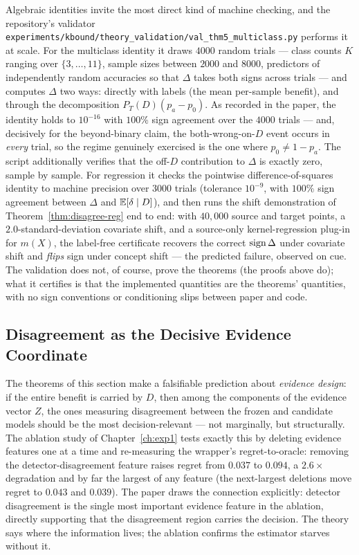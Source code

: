 Algebraic identities invite the most direct kind of machine checking, and the
repository's validator
\texttt{experiments/kbound/theory\_validation/val\_thm5\_multiclass.py}
\cite{kbound2026repo} performs it at scale. For the multiclass identity it draws
$4000$ random trials --- class counts $K$ ranging over $\{3,\dots,11\}$, sample sizes
between $2000$ and $8000$, predictors of independently random accuracies so that
$\Delta$ takes both signs across trials --- and computes $\Delta$ two ways: directly
with labels (the mean per-sample benefit), and through the decomposition
$P_T(D)(p_a-p_0)$. As recorded in the paper, the identity holds to $10^{-16}$ with
$100\%$ sign agreement over the $4000$ trials --- and, decisively for the
beyond-binary claim, the both-wrong-on-$D$ event occurs in \emph{every} trial, so the
regime genuinely exercised is the one where $p_0\neq1-p_a$. The script additionally
verifies that the off-$D$ contribution to $\Delta$ is exactly zero, sample by sample.
For regression it checks the pointwise difference-of-squares identity to machine
precision over $3000$ trials (tolerance $10^{-9}$, with $100\%$ sign agreement between
$\Delta$ and $\mathbb{E}[\delta\mid D]$), and then runs the shift demonstration of
Theorem~\ref{thm:disagree-reg} end to end: with $40{,}000$ source and target points, a
$2.0$-standard-deviation covariate shift, and a source-only kernel-regression plug-in
for $m(X)$, the label-free certificate recovers the correct $\operatorname{sign}\Delta$ under
covariate shift and \emph{flips} sign under concept shift --- the predicted failure,
observed on cue. The validation does not, of course, prove the theorems (the proofs
above do); what it certifies is that the implemented quantities are the theorems'
quantities, with no sign conventions or conditioning slips between paper and code.

\subsection{Disagreement as the Decisive Evidence Coordinate}
\label{sec:t2-disagree-evidence}

The theorems of this section make a falsifiable prediction about \emph{evidence
design}: if the entire benefit is carried by $D$, then among the components of the
evidence vector $Z$, the ones measuring disagreement between the frozen and candidate
models should be the most decision-relevant --- not marginally, but structurally. The
ablation study of Chapter~\ref{ch:exp1} tests exactly this by deleting evidence
features one at a time and re-measuring the wrapper's regret-to-oracle: removing the
detector-disagreement feature raises regret from $0.037$ to $0.094$, a $2.6\times$
degradation and by far the largest of any feature (the next-largest deletions move
regret to $0.043$ and $0.039$). The paper draws the connection explicitly: detector
disagreement is the single most important evidence feature in the ablation, directly
supporting that the disagreement region carries the decision. The theory says where
the information lives; the ablation confirms the estimator starves without it.

